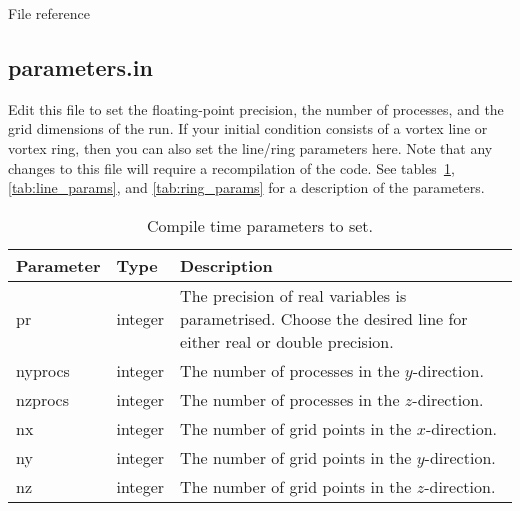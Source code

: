 \begin{chapter}{\label{cha:file_reference}File reference}
  \subsection{\label{subsec:parameters.in}parameters.in}
  Edit this file to set the floating-point precision, the number of processes,
  and the grid dimensions of the run.  If your initial condition consists of a
  vortex line or vortex ring, then you can also set the line/ring parameters
  here.  Note that any changes to this file will require a recompilation of the
  code.  See tables~\ref{tab:parameters.in}, \ref{tab:line_params}, and
  \ref{tab:ring_params} for a description of the parameters.
  \begin{table}[ht]
    \centering
    \begin{tabular}{llp{}}
      Parameter & Type & Description \\
      \hline
      pr & integer & The precision of real variables is parametrised.  Choose
      the desired line for either real or double precision. \\
      nyprocs & integer & The number of processes in the $y$-direction. \\
      nzprocs & integer & The number of processes in the $z$-direction. \\
      nx & integer & The number of grid points in the $x$-direction. \\
      ny & integer & The number of grid points in the $y$-direction. \\
      nz & integer & The number of grid points in the $z$-direction. \\
      \hline
    \end{tabular}
    \caption{\label{tab:parameters.in}Compile time parameters to set.}
  \end{table}
   

\end{chapter}
